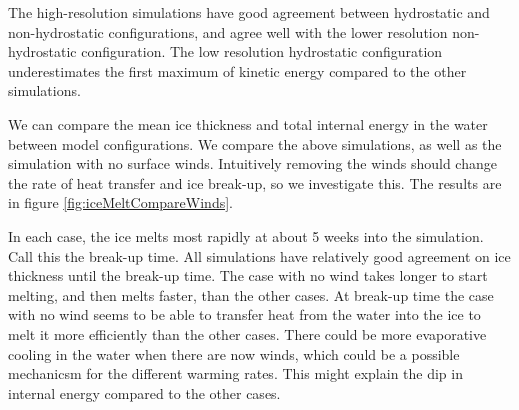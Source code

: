 \documentclass[11pt]{article}
\begin{document}
The high-resolution simulations have good agreement between hydrostatic and non-hydrostatic configurations, and agree well with the lower resolution non-hydrostatic configuration. The low resolution hydrostatic configuration underestimates the first maximum of kinetic energy compared to the other simulations.

We can compare the mean ice thickness and total internal energy in the water between model configurations. We compare the above simulations, as well as the simulation with no surface winds. Intuitively removing the winds should change the rate of heat transfer and ice break-up, so we investigate this. The results are in figure \ref{fig:iceMeltCompareWinds}.

In each case, the ice melts most rapidly at about 5 weeks into the simulation. Call this the break-up time. All simulations have relatively good agreement on ice thickness until the break-up time. The case with no wind takes longer to start melting, and then melts faster, than the other cases. At break-up time the case with no wind seems to be able to transfer heat from the water into the ice to melt it more efficiently than the other cases. There could be more evaporative cooling in the water when there are now winds, which could be a possible mechanicsm for the different warming rates. This might explain the dip in internal energy compared to the other cases.
\end{document}
